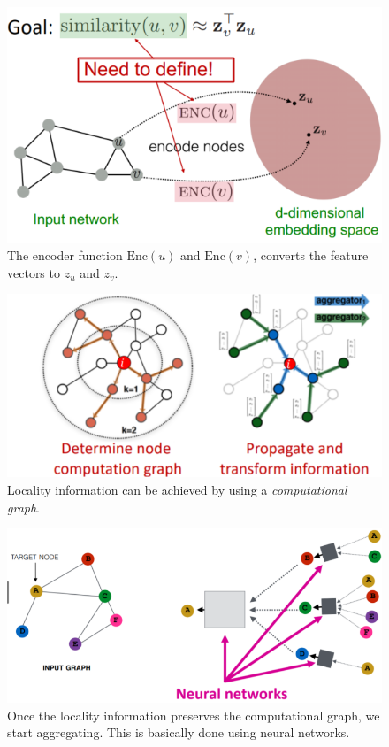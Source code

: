 \begin{figure}
    \centering
    \includegraphics[width=\textwidth]{images/fromInputNetworkToEmbeddingSpace.png}
    \caption{The encoder function $\text{Enc}(u)$ and $\text{Enc}(v)$, converts the feature vectors to $z_u$ and $z_v$.}
    \label{fig:fromInputNetworkToEmbeddingSpace}
\end{figure}

\begin{figure}
    \centering
    \includegraphics[width=\textwidth]{images/computationalGraph.png}
    \caption{Locality information can be achieved by using a \textit{computational graph}.}
    \label{fig:computationalGraph}
\end{figure}

\begin{figure}
    \centering
    \includegraphics[width=\textwidth]{images/computationalGraphNeuralNetwork.png}
    \caption{Once the locality information preserves the computational graph, we start aggregating. This is basically done using neural networks.}
    \label{fig:computationalGraphNeuralNetwork}
\end{figure}

